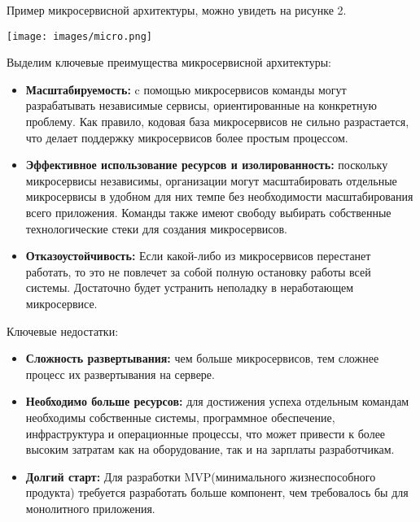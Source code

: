         Пример микросервисной архитектуры, можно увидеть на рисунке 2.
    
        \noindent\begin{minipage}[t]{\textwidth}
             \begin{center}
             \texttt{[image: images/micro.png]}
             \end{center} \label{fig:Moreno}
        \end{minipage}

    
    Выделим ключевые преимущества микросервисной архитектуры:

        \begin{itemize}
            \item \textbf{Масштабируемость:} c помощью микросервисов команды могут разрабатывать независимые сервисы, ориентированные на конкретную проблему. Как правило, кодовая база микросервисов не сильно разрастается, что делает поддержку микросервисов более простым процессом.
            \item \textbf{Эффективное использование ресурсов и изолированность:} поскольку микросервисы независимы, организации могут масштабировать отдельные микросервисы в удобном для них темпе без необходимости масштабирования всего приложения. Команды также имеют свободу выбирать собственные технологические стеки для создания микросервисов.
            \item \textbf{Отказоустойчивость:} Если какой-либо из микросервисов перестанет работать, то это не повлечет за собой полную остановку работы всей системы. Достаточно будет устранить неполадку в неработающем микросервисе. \cite{monovsmicro}
            
        \end{itemize}

         Ключевые недостатки:
          \begin{itemize}
            \item \textbf{Сложность развертывания:} чем больше микросервисов, тем сложнее процесс их развертывания на сервере.
            \item \textbf{Необходимо больше ресурсов:} для достижения успеха отдельным командам необходимы собственные системы, программное обеспечение, инфраструктура и операционные процессы, что может привести к более высоким затратам как на оборудование, так и на зарплаты разработчикам. 
            \item \textbf{Долгий старт:} Для разработки MVP(минимального жизнеспособного продукта) требуется разработать больше компонент, чем требовалось бы для монолитного приложения.
        \end{itemize}

